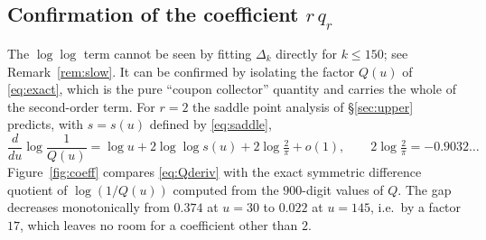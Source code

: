 \documentclass[10pt,a4paper]{amsart}
\numberwithin{equation}{section}
\begin{document}
\subsection{Confirmation of the coefficient $r\,q_r$}\label{sub:coeff}
The $\log\log$ term cannot be seen by fitting $\Delta_k$ directly for $k\le150$; see
Remark~\ref{rem:slow}. It can be confirmed by isolating the factor $Q(u)$ of
\eqref{eq:exact}, which is the pure ``coupon collector'' quantity and carries the whole of
the second-order term. For $r=2$ the saddle point analysis of \S\ref{sec:upper} predicts,
with $s=s(u)$ defined by \eqref{eq:saddle},
\begin{equation}\label{eq:Qderiv}
  \frac{d}{du}\log\frac1{Q(u)}=\log u+2\log\log s(u)+2\log\tfrac2\pi+o(1),
  \qquad 2\log\tfrac2\pi=-0.9032\ldots
\end{equation}
Figure~\ref{fig:coeff} compares \eqref{eq:Qderiv} with the exact symmetric difference
quotient of $\log(1/Q(u))$ computed from the $900$-digit values of $Q$. The gap decreases
monotonically from $0.374$ at $u=30$ to $0.022$ at $u=145$, i.e.\ by a factor $17$, which
leaves no room for a coefficient other than $2$.
\end{document}
